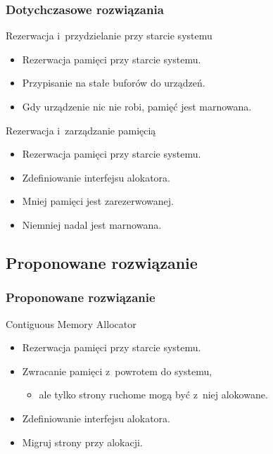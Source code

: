 \begin{frame}
  \frametitle{Dotychczasowe rozwiązania}

  \begin{block}{Rezerwacja i~przydzielanie przy starcie systemu}
    \begin{itemize}
    \item Rezerwacja pamięci przy starcie systemu.
    \item Przypisanie na stałe buforów do urządzeń.
    \item Gdy urządzenie nic nie robi, pamięć jest marnowana.
    \end{itemize}
  \end{block}

  \begin{block}{Rezerwacja i~zarządzanie pamięcią}
    \begin{itemize}
    \item Rezerwacja pamięci przy starcie systemu.
    \item Zdefiniowanie interfejsu alokatora.
    \item Mniej pamięci jest zarezerwowanej.
    \item Niemniej nadal jest marnowana.
    \end{itemize}
  \end{block}
\end{frame}

\subsection{Proponowane rozwiązanie}

\begin{frame}
  \frametitle{Proponowane rozwiązanie}

  \begin{block}{Contiguous Memory Allocator}
    \begin{itemize}
    \item Rezerwacja pamięci przy starcie systemu.
    \item Zwracanie pamięci z~powrotem do systemu,
      \begin{itemize}
      \item ale tylko strony ruchome mogą być z~niej alokowane.
      \end{itemize}
    \item Zdefiniowanie interfejsu alokatora.
    \item Migruj strony przy alokacji.
    \end{itemize}
  \end{block}
\end{frame}


